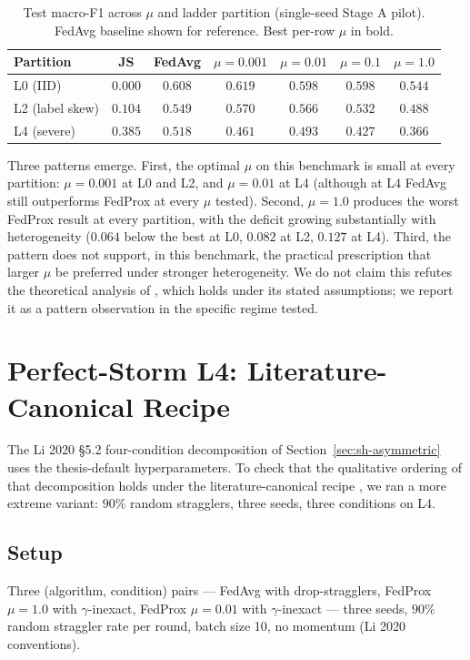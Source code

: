 \documentclass[11pt,a4paper]{report}
\begin{document}
\begin{table}[!htbp]
\centering
\caption{Test macro-F1 across $\mu$ and ladder partition (single-seed
Stage A pilot). FedAvg baseline shown for reference. Best per-row
$\mu$ in bold.}
\label{tab:mu-cross-partition}
\small
\begin{tabular}{lcccccc}
\toprule
Partition & JS  & FedAvg & $\mu{=}0.001$ & $\mu{=}0.01$ & $\mu{=}0.1$ & $\mu{=}1.0$ \\
\midrule
L0 (IID)        & $0.000$ & $0.608$ & $\mathbf{0.619}$ & $0.598$ & $0.598$ & $0.544$ \\
L2 (label skew) & $0.104$ & $0.549$ & $\mathbf{0.570}$ & $0.566$ & $0.532$ & $0.488$ \\
L4 (severe)     & $0.385$ & $\mathbf{0.518}$ & $0.461$ & $0.493$ & $0.427$ & $0.366$ \\
\bottomrule
\end{tabular}
\end{table}

Three patterns emerge. First, the optimal $\mu$ on this benchmark is
small at every partition: $\mu = 0.001$ at L0 and L2, and
$\mu = 0.01$ at L4 (although at L4 FedAvg still outperforms FedProx
at every $\mu$ tested). Second, $\mu = 1.0$ produces the worst
FedProx result at every partition, with the deficit growing
substantially with heterogeneity ($0.064$ below the best at L0,
$0.082$ at L2, $0.127$ at L4). Third, the pattern does not support,
in this benchmark, the practical prescription that larger $\mu$ be
preferred under stronger heterogeneity. We do not claim this refutes
the theoretical analysis of \citet{li2020fedprox}, which holds under
its stated assumptions; we report it as a pattern observation in the
specific regime tested.


\section{Perfect-Storm L4: Literature-Canonical Recipe}
\label{sec:perfect-storm}

The Li 2020 §5.2 four-condition decomposition of
Section~\ref{sec:sh-asymmetric} uses the thesis-default
hyperparameters. To check that the qualitative ordering of that
decomposition holds under the literature-canonical recipe
\citep{li2020fedprox}, we ran a more extreme variant: $90\%$ random
stragglers, three seeds, three conditions on L4.

\subsection{Setup}
Three (algorithm, condition) pairs --- FedAvg with drop-stragglers,
FedProx $\mu = 1.0$ with $\gamma$-inexact, FedProx $\mu = 0.01$ with
$\gamma$-inexact --- three seeds, $90\%$ random straggler rate per
round, batch size 10, no momentum (Li 2020 conventions).
\end{document}
